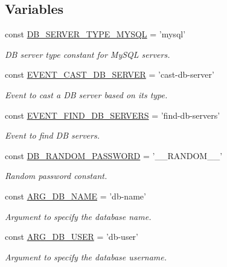 \subsection*{Variables}
\begin{DoxyCompactItemize}
\item 
const \hyperlink{group__db__types_gafd3ae7ec92c3a6337eb1037efc55bc18}{D\-B\-\_\-\-S\-E\-R\-V\-E\-R\-\_\-\-T\-Y\-P\-E\-\_\-\-M\-Y\-S\-Q\-L} = 'mysql'
\begin{DoxyCompactList}\small\item\em D\-B server type constant for My\-S\-Q\-L servers. \end{DoxyCompactList}\item 
const \hyperlink{group__events_ga995abd83b9e56a165029cc26c24cdb13}{E\-V\-E\-N\-T\-\_\-\-C\-A\-S\-T\-\_\-\-D\-B\-\_\-\-S\-E\-R\-V\-E\-R} = 'cast-\/db-\/server'
\begin{DoxyCompactList}\small\item\em Event to cast a D\-B server based on its type. \end{DoxyCompactList}\item 
const \hyperlink{group__events_gadbf9bda7e59b16c872f429349760b4dc}{E\-V\-E\-N\-T\-\_\-\-F\-I\-N\-D\-\_\-\-D\-B\-\_\-\-S\-E\-R\-V\-E\-R\-S} = 'find-\/db-\/servers'
\begin{DoxyCompactList}\small\item\em Event to find D\-B servers. \end{DoxyCompactList}\item 
const \hyperlink{DatabaseConfigurationPlugin_8class_a5ecc138658687e351751a4a6e3cad639}{D\-B\-\_\-\-R\-A\-N\-D\-O\-M\-\_\-\-P\-A\-S\-S\-W\-O\-R\-D} = '\-\_\-\-\_\-\-R\-A\-N\-D\-O\-M\-\_\-\-\_\-'
\begin{DoxyCompactList}\small\item\em Random password constant. \end{DoxyCompactList}\item 
const \hyperlink{group__args_ga98d79ebbd1d09c1229a78e064d36e935}{A\-R\-G\-\_\-\-D\-B\-\_\-\-N\-A\-M\-E} = 'db-\/name'
\begin{DoxyCompactList}\small\item\em Argument to specify the database name. \end{DoxyCompactList}\item 
const \hyperlink{group__args_ga8a8e04a675209a2384eb4cc98004f1f2}{A\-R\-G\-\_\-\-D\-B\-\_\-\-U\-S\-E\-R} = 'db-\/user'
\begin{DoxyCompactList}\small\item\em Argument to specify the database username. \end{DoxyCompactList}\item 

\end{DoxyCompactItemize}
